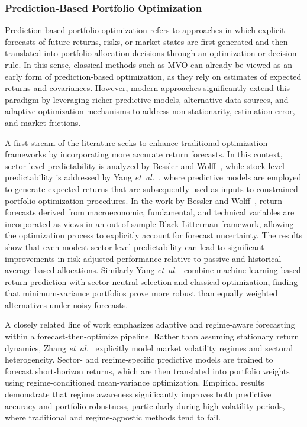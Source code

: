\subsubsection{Prediction-Based Portfolio Optimization}
\label{section:portfolio_optimization:prediction_based}

Prediction-based portfolio optimization refers to approaches in which explicit forecasts of future returns, risks, or market states are first generated and then translated into portfolio allocation decisions through an optimization or decision rule. In this sense, classical methods such as MVO can already be viewed as an early form of prediction-based optimization, as they rely on estimates of expected returns and covariances. However, modern approaches significantly extend this paradigm by leveraging richer predictive models, alternative data sources, and adaptive optimization mechanisms to address non-stationarity, estimation error, and market frictions.

A first stream of the literature seeks to enhance traditional optimization frameworks by incorporating more accurate return forecasts. In this context, sector-level predictability is analyzed by Bessler and Wolff~\cite{83780}, while stock-level predictability is addressed by Yang \emph{et~al.}~\cite{4061c}, where predictive models are employed to generate expected returns that are subsequently used as inputs to constrained portfolio optimization procedures. In the work by Bessler and Wolff~\cite{83780}, return forecasts derived from macroeconomic, fundamental, and technical variables are incorporated as views in an out-of-sample Black-Litterman framework, allowing the optimization process to explicitly account for forecast uncertainty. The results show that even modest sector-level predictability can lead to significant improvements in risk-adjusted performance relative to passive and historical-average-based allocations. Similarly Yang \emph{et~al.}~\cite{4061c} combine machine-learning-based return prediction with sector-neutral selection and classical optimization, finding that minimum-variance portfolios prove more robust than equally weighted alternatives under noisy forecasts.

A closely related line of work emphasizes adaptive and regime-aware forecasting within a forecast-then-optimize pipeline. Rather than assuming stationary return dynamics, Zhang \emph{et~al.}~\cite{4e332} explicitly model market volatility regimes and sectoral heterogeneity. Sector- and regime-specific predictive models are trained to forecast short-horizon returns, which are then translated into portfolio weights using regime-conditioned mean-variance optimization. Empirical results demonstrate that regime awareness significantly improves both predictive accuracy and portfolio robustness, particularly during high-volatility periods, where traditional and regime-agnostic methods tend to fail.

